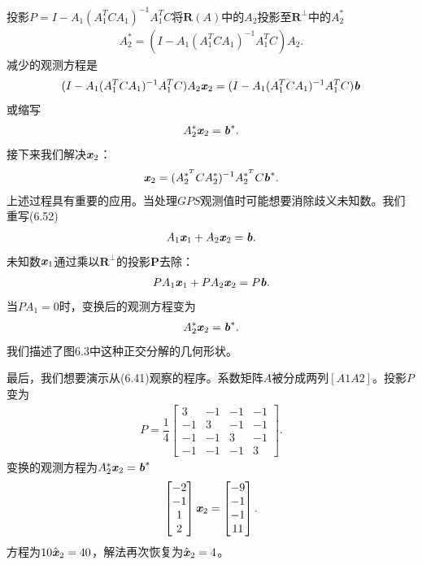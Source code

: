 投影$P = I -A_{1}(A^{T}_{1}CA_{1})^{-1}A^{T}_{1}C $将$\textbf{R}(A)$中的$A_{2}$投影至$\textbf{R}^{\bot} $中的$ A^{*}_{2}$
\begin{align*}
A^{*}_{2} = (I -A_{1}(A^{T}_{1}CA_{1})^{-1}A^{T}_{1}C)A_{2}.
\end{align*}
减少的观测方程是
\begin{align*}
(I -A_{1}(A^{T}_{1}CA_{1})^{-1}A^{T}_{1}C)A_{2}\textbf{\textit{x}}_{2} =
(I -A_{1}(A^{T}_{1}CA_{1})^{-1}A^{T}_{1}C)\textbf{\textit{b}}
\end{align*}
或缩写
\begin{align*}
A^{*}_{2}\textbf{\textit{x}}_{2} = \textbf{\textit{b}}^{*}.
\end{align*}
接下来我们解决$ \textbf{\textit{x}}_{2}$：
\begin{align}
\textbf{\textit{x}}_{2} = ( A^{*^T}_{2}CA^{*}_{2} )^{-1}A^{*^T}_{2}C \textbf{\textit{b}}^{*}.
\end{align}
上述过程具有重要的应用。当处理$GPS$观测值时可能想要消除歧义未知数。我们重写(6.52)
\begin{align*}
A_{1}\textbf{\textit{x}}_{1} + A_{2}\textbf{\textit{x}}_{2} = \textbf{\textit{b}}.
\end{align*}
未知数$\textbf{\textit{x}}_{1}$通过乘以$\textbf{R}^{\bot}$的投影$\textbf{P}$去除：
\begin{align*}
PA_{1}\textbf{\textit{x}}_{1} + PA_{2}\textbf{\textit{x}}_{2} = P\textbf{\textit{b}}.
\end{align*}
当$PA_{1}=0$时，变换后的观测方程变为
\begin{align*}
A^{*}_{2}\textbf{\textit{x}}_{2}= \textbf{\textit{b}}^{*}.
\end{align*}
我们描述了图6.3中这种正交分解的几何形状。

最后，我们想要演示从(6.41)观察的程序。系数矩阵$A$被分成两列$[A1 A2]$。投影$P$变为
\begin{align*}
P = \dfrac{1}{4}
\begin{bmatrix}
3 & -1 & -1 & -1 \\
-1 & 3 & -1 & -1 \\
-1 & -1 & 3 & -1 \\
-1 & -1 & -1 & 3 
\end{bmatrix}.
\end{align*}
变换的观测方程为$A^{*}_{2}\textbf{\textit{x}}_{2} = \textbf{\textit{b}}^{*} $
\begin{align*}
\begin{bmatrix}
-2 \\
-1 \\
1 \\
2 
\end{bmatrix}
\textbf{\textit{x}}_{2}= 
\begin{bmatrix}
-9 \\
-1 \\
-1 \\
11 
\end{bmatrix}.
\end{align*}
方程为$10\hat{\textbf{\textit{x}}}_{2}=40$，解法再次恢复为$\hat{\textbf{\textit{x}}}_{2} = 4 $。

